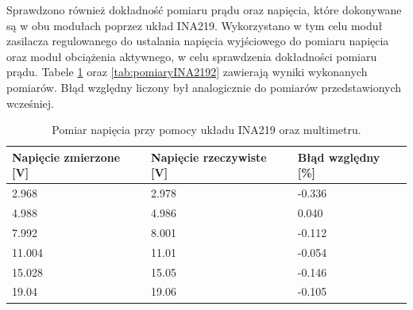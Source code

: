 Sprawdzono również dokładność pomiaru prądu oraz napięcia, które dokonywane są w obu modułach poprzez układ INA219.
Wykorzystano w tym celu moduł zasilacza regulowanego do ustalania napięcia wyjściowego do pomiaru napięcia oraz 
moduł obciążenia aktywnego, w celu sprawdzenia dokładności pomiaru prądu. Tabele \ref{tab:pomiaryINA219} oraz 
\ref{tab:pomiaryINA2192} zawierają wyniki wykonanych pomiarów. Błąd względny liczony był analogicznie 
do pomiarów przedstawionych wcześniej.


\begin{table}[]
\centering
\begin{tabular}{|l|l|l|}
\hline
Napięcie zmierzone {[}V{]} & Napięcie rzeczywiste {[}V{]} & Błąd względny   {[}\%{]} \\ \hline
2.968                      & 2.978                        & -0.336             \\ \hline
4.988                      & 4.986                        & 0.040              \\ \hline
7.992                      & 8.001                        & -0.112             \\ \hline
11.004                     & 11.01                        & -0.054             \\ \hline
15.028                     & 15.05                        & -0.146             \\ \hline
19.04                      & 19.06                        & -0.105             \\ \hline
\end{tabular}
\caption{Pomiar napięcia przy pomocy układu INA219 oraz multimetru.}
\label{tab:pomiaryINA219}
\end{table}

